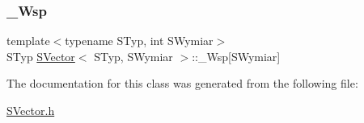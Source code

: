 \subsubsection{\texorpdfstring{\+\_\+\+Wsp}{\_Wsp}}
{\footnotesize\ttfamily template$<$typename S\+Typ, int S\+Wymiar$>$ \\
S\+Typ \hyperlink{classSVector}{S\+Vector}$<$ S\+Typ, S\+Wymiar $>$\+::\+\_\+\+Wsp\mbox{[}S\+Wymiar\mbox{]}\hspace{0.3cm}{\ttfamily [private]}}



The documentation for this class was generated from the following file\+:\begin{DoxyCompactItemize}
\item 
\hyperlink{SVector_8h}{S\+Vector.\+h}\end{DoxyCompactItemize}
